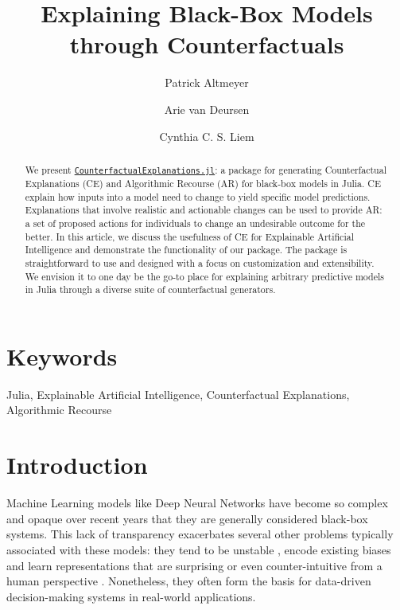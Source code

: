 \documentclass{juliacon}
\title{Explaining Black-Box Models through Counterfactuals}
\author[1]{Patrick Altmeyer}
\author[1]{Arie van Deursen}
\author[1]{Cynthia C. S. Liem}
\affil[1]{Delft University of Technology}
\date{}
\providecommand{\JCONkeywords}[1]
{
  \small	
  \section*{Keywords} #1
}
\begin{document}
\maketitle

\begin{abstract}

We present
\href{https://github.com/JuliaTrustworthyAI/CounterfactualExplanations.jl}{\texttt{CounterfactualExplanations.jl}}:
a package for generating Counterfactual Explanations (CE) and
Algorithmic Recourse (AR) for black-box models in Julia. CE explain how
inputs into a model need to change to yield specific model predictions.
Explanations that involve realistic and actionable changes can be used
to provide AR: a set of proposed actions for individuals to change an
undesirable outcome for the better. In this article, we discuss the
usefulness of CE for Explainable Artificial Intelligence and demonstrate
the functionality of our package. The package is straightforward to use
and designed with a focus on customization and extensibility. We
envision it to one day be the go-to place for explaining arbitrary
predictive models in Julia through a diverse suite of counterfactual
generators.
\end{abstract}

\JCONkeywords{Julia, Explainable Artificial Intelligence, Counterfactual
Explanations, Algorithmic Recourse}


\setcounter{page}{1}

\ifdefined\Shaded\renewenvironment{Shaded}{\begin{tcolorbox}[interior hidden, breakable, enhanced, frame hidden, boxrule=0pt, borderline west={3pt}{0pt}{shadecolor}, sharp corners]}{\end{tcolorbox}}\fi

\hypertarget{sec-intro}{%
\section{Introduction}\label{sec-intro}}

Machine Learning models like Deep Neural Networks have become so complex
and opaque over recent years that they are generally considered
black-box systems. This lack of transparency exacerbates several other
problems typically associated with these models: they tend to be
unstable \autocite{goodfellow2014explaining}, encode existing biases
\autocite{buolamwini2018gender} and learn representations that are
surprising or even counter-intuitive from a human perspective
\autocite{buolamwini2018gender}. Nonetheless, they often form the basis
for data-driven decision-making systems in real-world applications.
\end{document}
